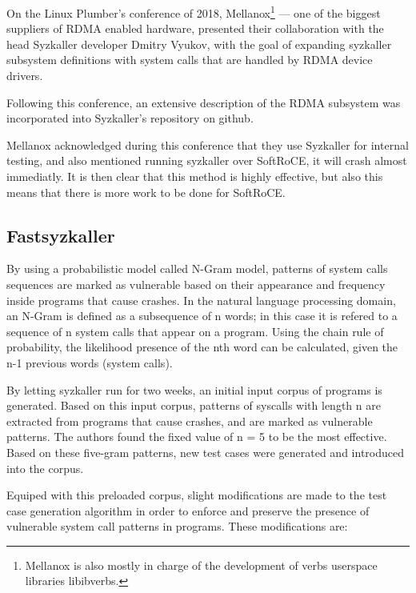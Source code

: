 On the Linux Plumber's conference of 2018, Mellanox\footnote{Mellanox is also mostly in charge of the development  of verbs userspace libraries libibverbs.} --- one of the biggest suppliers of RDMA enabled hardware,
presented their collaboration with the head Syzkaller
developer Dmitry Vyukov, with the goal of expanding syzkaller subsystem definitions with system calls
that are handled by RDMA device drivers\cite{osherovichImprovingTestingRDMA2018}.

Following this conference, an extensive description of the RDMA subsystem was incorporated into Syzkaller's repository on github.

Mellanox acknowledged during this conference that they use Syzkaller for internal testing,
and also mentioned running syzkaller over SoftRoCE, it will crash almost immediatly. It is then clear
that this method is highly effective, but also this means that there is more work to be done
for SoftRoCE.\@



\subsection{Fastsyzkaller}\label{ss:fastsyzkaller}

By using a probabilistic model called N-Gram model, patterns of system calls sequences are marked as vulnerable based on their appearance and
frequency inside programs that cause crashes. In the natural language processing domain, an N-Gram is defined as a subsequence
of n words; in this case it is refered to a sequence of n system calls that appear on a program. Using the chain rule
of probability, the likelihood presence of the nth word can be calculated, given the n-1 previous words (system calls)\cite{jurafskySpeechLanguageProcessing2000}.

By letting syzkaller run for two weeks, an initial input corpus of programs is generated. Based on this input corpus,
patterns of syscalls with length n are extracted from programs that cause crashes, and are marked as vulnerable
patterns. The authors found the fixed value of n = 5 to be the most effective\cite{liFastSyzkallerImprovingFuzz2019}.
Based on these five-gram patterns, new test cases were generated and introduced into the corpus.

Equiped with this preloaded corpus, slight modifications are made to the test case generation algorithm in order
to enforce and preserve the presence of vulnerable system call patterns in programs. These modifications are:

